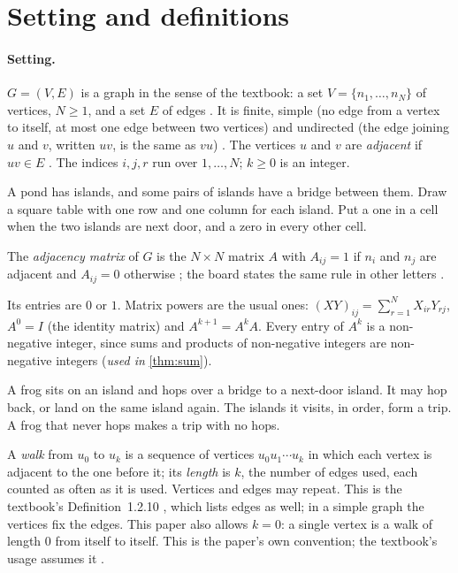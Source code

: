 \section{Setting and definitions}\label{sec:setting}

\paragraph{Setting.} $G=(V,E)$ is a graph in the sense of the textbook:
a set $V=\{n_1,\dots,n_N\}$ of vertices, $N\ge 1$, and a set $E$ of edges
\cite[Definition~1.1.1, p.~9]{petrosyan2015graphs}. It is finite, simple
(no edge from a vertex to itself, at most one edge between two vertices) and
undirected (the edge joining $u$ and $v$, written $uv$, is the same as $vu$)
\cite{userstatements}. The vertices $u$ and $v$ are \emph{adjacent} if
$uv\in E$ \cite[Definition~1.1.4, p.~11]{petrosyan2015graphs}. The indices
$i,j,r$ run over $1,\dots,N$; $k\ge 0$ is an integer.

\plainwords{} A pond has islands, and some pairs of islands have a bridge between them. Draw a square table with one row and one column for each island. Put a one in a cell when the two islands are next door, and a zero in every other cell.

\begin{definition}\label{def:matrix}
The \emph{adjacency matrix} of $G$ is the $N\times N$ matrix $A$ with
$A_{ij}=1$ if $n_i$ and $n_j$ are adjacent and $A_{ij}=0$ otherwise
\cite[p.~11]{petrosyan2015graphs}; the board states the same rule in other
letters \cite{whiteboard1,whiteboard2}.
\end{definition}
Its entries are $0$ or $1$. Matrix powers are the usual ones: $(XY)_{ij}=\sum_{r=1}^{N}X_{ir}Y_{rj}$,
$A^0=I$ (the identity matrix) and $A^{k+1}=A^kA$. Every entry of
$A^k$ is a non-negative integer, since sums and products of non-negative
integers are non-negative integers (\emph{used in} \cref{thm:sum}).

\plainwords{} A frog sits on an island and hops over a bridge to a next-door island. It may hop back, or land on the same island again. The islands it visits, in order, form a trip. A frog that never hops makes a trip with no hops.

\begin{definition}[Walk]\label{def:walk}
A \emph{walk} from $u_0$ to $u_k$ is a sequence of vertices
$u_0u_1\cdots u_k$ in which each vertex is adjacent to the one before it; its
\emph{length} is $k$, the number of edges used, each counted as often as it
is used. Vertices and edges may repeat. This is the textbook's Definition~1.2.10
\cite[p.~21]{petrosyan2015graphs}, which lists edges as well; in a simple graph
the vertices fix the edges. This paper also allows $k=0$: a single vertex is a walk of length $0$ from itself to
itself. This is the paper's own convention; the textbook's usage assumes it
\cite[pp.~23, 49]{petrosyan2015graphs}.
\end{definition}

